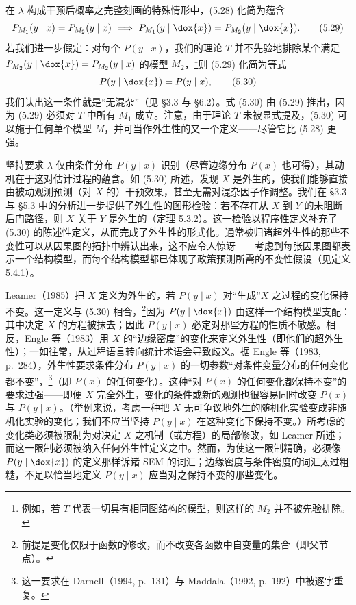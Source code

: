 在 $\lambda$ 构成干预后概率之完整刻画的特殊情形中，\textup{(5.28)} 化简为蕴含
\begin{equation}
P_{M_1}(y\mid x)=P_{M_2}(y\mid x)\ \Longrightarrow\ P_{M_1}(y\mid \dox{x})=P_{M_2}(y\mid \dox{x}). \tag{5.29}
\end{equation}
若我们进一步假定：对每个 $P(y\mid x)$，我们的理论 $T$ 并不先验地排除某个满足 $P_{M_2}(y\mid \dox{x})=P_{M_2}(y\mid x)$ 的模型 $M_2$，\footnote{例如，若 $T$ 代表一切具有相同图结构的模型，则这样的 $M_2$ 并不被先验排除。}则 \textup{(5.29)} 化简为等式
\begin{equation}
P(y\mid \dox{x})=P(y\mid x), \tag{5.30}
\end{equation}
我们认出这一条件就是“无混杂”（见 \S 3.3 与 \S 6.2）。式 \textup{(5.30)} 由 \textup{(5.29)} 推出，因为 \textup{(5.29)} 必须对 $T$ 中所有 $M_1$ 成立。注意，由于理论 $T$ 未被显式提及，\textup{(5.30)} 可以施于任何单个模型 $M$，并可当作外生性的又一个定义——尽管它比 \textup{(5.28)} 更强。

坚持要求 $\lambda$ 仅由条件分布 $P(y\mid x)$ 识别（尽管边缘分布 $P(x)$ 也可得），其动机在于这对估计过程的蕴含。如 \textup{(5.30)} 所述，发现 $X$ 是外生的，使我们能够直接由被动观测预测（对 $X$ 的）干预效果，甚至无需对混杂因子作调整。我们在 \S 3.3 与 \S 5.3 中的分析进一步提供了外生性的图形检验：若不存在从 $X$ 到 $Y$ 的未阻断后门路径，则 $X$ 关于 $Y$ 是外生的（定理 5.3.2）。这一检验以程序性定义补充了 \textup{(5.30)} 的陈述性定义，从而完成了外生性的形式化。通常被归诸超外生性的那些不变性可以从因果图的拓扑中辨认出来，这不应令人惊讶——考虑到每张因果图都表示一个结构模型，而每个结构模型都已体现了政策预测所需的不变性假设（见定义 5.4.1）。

Leamer（1985）把 $X$ 定义为外生的，若 $P(y\mid x)$ 对“生成”$X$ 之过程的变化保持不变。这一定义与 \textup{(5.30)} 相合，\footnote{前提是变化仅限于函数的修改，而不改变各函数中自变量的集合（即父节点）。}因为 $P(y\mid \dox{x})$ 由这样一个结构模型支配：其中决定 $X$ 的方程被抹去；因此 $P(y\mid x)$ 必定对那些方程的性质不敏感。相反，Engle 等（1983）用 $X$ 的“边缘密度”的变化来定义外生性（即他们的超外生性）；一如往常，从过程语言转向统计术语会导致歧义。据 Engle 等（1983, p.~284），外生性要求条件分布 $P(y\mid x)$ 的一切参数“对条件变量分布的任何变化都不变”，\footnote{这一要求在 Darnell（1994, p.~131）与 Maddala（1992, p.~192）中被逐字重复。}（即 $P(x)$ 的任何变化）。这种“对 $P(x)$ 的任何变化都保持不变”的要求过强——即便 $X$ 完全外生，变化的条件或新的观测也很容易同时改变 $P(x)$ 与 $P(y\mid x)$。（举例来说，考虑一种把 $X$ 无可争议地外生的随机化实验变成非随机化实验的变化；我们不应当坚持 $P(y\mid x)$ 在这种变化下保持不变。）所考虑的变化类必须被限制为对决定 $X$ 之机制（或方程）的局部修改，如 Leamer 所述；而这一限制必须被纳入任何外生性定义之中。然而，为使这一限制精确，必须像 $P(y\mid \dox{x})$ 的定义那样诉诸 SEM 的词汇；边缘密度与条件密度的词汇太过粗糙，不足以恰当地定义 $P(y\mid x)$ 应当对之保持不变的那些变化。

